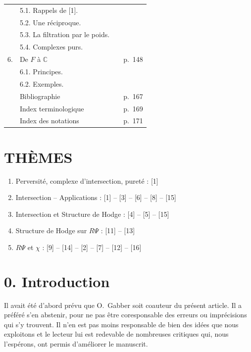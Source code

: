 \documentclass[12pt,a4paper]{article}
\theoremstyle{plain}
\theoremstyle{definition}
\theoremstyle{remark}
\newcommand{\CC}{\mathbb{C}}
\begin{document}
\begin{tabular}{@{}llp{3cm}l@{}}
& 5.1. Rappels de [1]. & & \\[0.5ex]
& 5.2. Une réciproque. & & \\[0.5ex]
& 5.3. La filtration par le poids. & & \\[0.5ex]
& 5.4. Complexes purs. & & \\[1ex]
6. & De $F$ à $\CC$ & \dotfill & p.~148 \\[0.5ex]
& 6.1. Principes. & & \\[0.5ex]
& 6.2. Exemples. & & \\[1ex]
& Bibliographie & \dotfill & p.~167 \\[1ex]
& Index terminologique & \dotfill & p.~169 \\[1ex]
& Index des notations & \dotfill & p.~171
\end{tabular}
\newpage

\thispagestyle{empty}
\section*{TH\`EMES}

\begin{enumerate}[label=\alph*)]
\item Perversité, complexe d'intersection, pureté : [1]
\item Intersection -- Applications : [1] -- [3] -- [6] -- [8] -- [15]
\item Intersection et Structure de Hodge : [4] -- [5] -- [15]
\item Structure de Hodge sur $R\Psi$ : [11] -- [13]
\item $R\Psi$ et $\chi$ : [9] -- [14] -- [2] -- [7] -- [12] -- [16]
\end{enumerate}
\newpage

\setcounter{page}{7}
\section*{0. Introduction}

Il avait été d'abord prévu que O.~Gabber soit coauteur du présent article. Il a préféré s'en abstenir, pour ne pas être coresponsable des erreurs ou imprécisions qui s'y trouvent. Il n'en est pas moins responsable de bien des idées que nous exploitons et le lecteur lui est redevable de nombreuses critiques qui, nous l'espérons, ont permis d'améliorer le manuscrit.
\end{document}
